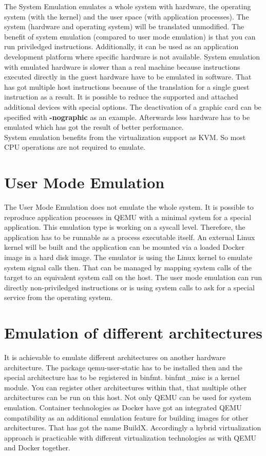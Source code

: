 The System Emulation emulates a whole system with hardware, the operating system (with the kernel) and the user space (with application processes). 
The system (hardware and operating system) will be translated unmodified. The benefit of system emulation (compared to user mode emulation) is that you can run priviledged instructions\cite{Butt2011}. 
Additionally, it can be used as an application development platform where specific hardware is not available. 
System emulation with emulated hardware is slower than a real machine because instructions executed directly in the guest hardware have to be emulated in software. 
That has got multiple host instructions because of the translation for a single guest instruction as a result\cite[~p.1]{Tong2014}.
It is possible to reduce the supported and attached additional devices with special options. The deactivation of a graphic card can be specified with \textbf{-nographic} as an example. Afterwards less hardware has to be emulated which has got the result of better performance. \\
System emulation benefits from the virtualization support as KVM. So most CPU operations are not required to emulate.

\section{User Mode Emulation}

The User Mode Emulation does not emulate the whole system. It is possible to reproduce application processes in QEMU with a minimal system for a special application. 
This emulation type is working on a syscall level. Therefore, the application has to be runnable as a process executable itself. 
An external Linux kernel will be built and the application can be mounted via a loaded Docker image in a hard disk image. The emulator is using the Linux kernel to emulate system signal calls then. That can be managed by mapping system calls of the target to an equivalent system call on the host.
The user mode emulation can run directly non-priviledged instructions or is using system calls to ask for a special service from the operating system\cite{Butt2011}.


\section{Emulation of different architectures}

It is achievable to emulate different architectures on another hardware architecture. The package qemu-user-static has to be installed then and the special architecture has to be registered in binfmt. binfmt\_misc is a kernel module. 
You can register other architectures within that, that multiple other architectures can be run on this host. 
Not only QEMU can be used for system emulation. Container technologies as Docker have got an integrated QEMU compatibility as an additional emulation feature for building images for other architectures. 
That has got the name BuildX. Accordingly a hybrid virtualization approach is practicable with different virtualization technologies as with QEMU and Docker together.


